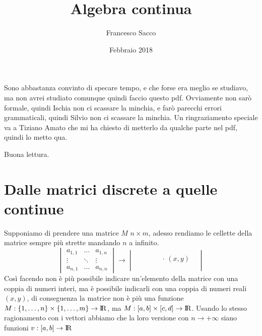 \documentclass[11pt,a4paper]{article}
\date{Febbraio 2018}
\title{Algebra continua}
\author{Francesco Sacco}
\theoremstyle{definition}
\theoremstyle{plain}
\theoremstyle{plain}
\begin{document}
	\maketitle
	Sono abbastanza convinto di specare tempo, e che forse era meglio se studiavo, ma non avrei studiato comunque quindi faccio questo pdf.\newline
	Ovviamente non sarò formale, quindi Ischia non ci scassare la minchia, e farò parecchi errori grammaticali, quindi Silvio non ci scassare la minchia.\newline
	Un ringraziamento speciale va a Tiziano Amato che mi ha chiesto di metterlo da qualche parte nel pdf, quindi lo metto qua.\newline

	Buona lettura.
	

	\section{Dalle matrici discrete a quelle continue}
		Supponiamo di prendere una matrice $M$ $ n \times m$, adesso rendiamo le cellette della matrice sempre più strette mandando $n$ a infinito.
		\begin{equation}
			\begin{vmatrix}
				a_{1,1} & \dots & a_{1,n} \\
				\vdots	&	\ddots&	\vdots	\\
				a_{n,1} & \dots & a_{n,n} 
			\end{vmatrix}
			\longrightarrow
			\begin{vmatrix}
				&\quad & & \\
				&\ &\quad \cdot \, (x,y) & \\
				& & & \\
			\end{vmatrix}
		\end{equation}
		Così facendo non è più possibile indicare un'elemento della matrice con una coppia di numeri interi, ma è possibile indicarli con una coppia di numeri reali $(x,y)$, di  conseguenza la matrice non è più una funzione $M:\{1,\dots,n\}\times\{1,\dots,m\} \rightarrow \rm I\!R$, ma $M:[a,b]\times [c,d]\rightarrow \rm I\!R$.\newline
		Usando lo stesso ragionamento con i vettori abbiamo che la loro versione con $n\rightarrow +\infty$ siano funzioni $v:[a,b]\rightarrow \rm I\!R$ 
	
	
\end{document}

